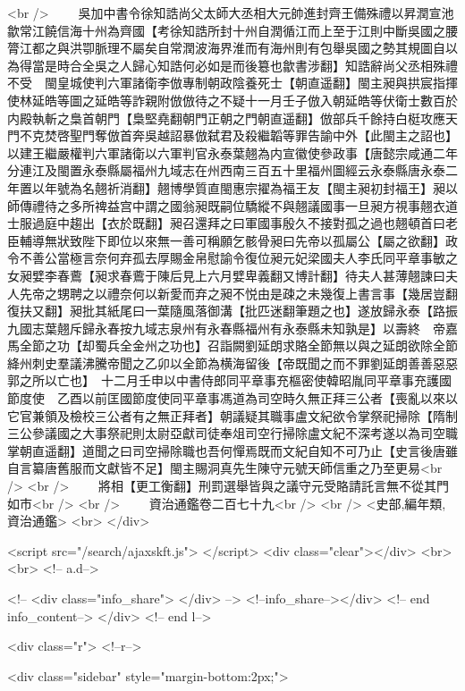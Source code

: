 <br />
　　吳加中書令徐知誥尚父太師大丞相大元帥進封齊王備殊禮以昇潤宣池歙常江饒信海十州為齊國【考徐知誥所封十州自潤循江而上至于江則中斷吳國之腰膂江都之與洪卾脈理不屬矣自常潤波海界淮而有海州則有包舉吳國之勢其規圖自以為得當是時合全吳之人歸心知誥何必如是而後簒也歙書涉翻】知誥辭尚父丞相殊禮不受　閩皇城使判六軍諸衛李倣專制朝政陰養死士【朝直遥翻】閩主昶與拱宸指揮使林延皓等圖之延皓等詐親附倣倣待之不疑十一月壬子倣入朝延皓等伏衛士數百於内殿執斬之梟首朝門【梟堅堯翻朝門正朝之門朝直遥翻】倣部兵千餘持白梃攻應天門不克焚啓聖門奪倣首奔吳越詔暴倣弑君及殺繼韜等罪告諭中外【此閩主之詔也】以建王繼嚴權判六軍諸衛以六軍判官永泰葉翹為内宣徽使參政事【唐懿宗咸通二年分連江及閩置永泰縣屬福州九域志在州西南三百五十里福州圖經云永泰縣唐永泰二年置以年號為名翹祈消翻】翹博學質直閩惠宗擢為福王友【閩主昶初封福王】昶以師傳禮待之多所禆益宫中謂之國翁昶既嗣位驕縱不與翹議國事一旦昶方視事翹衣道士服過庭中趨出【衣於既翻】昶召還拜之曰軍國事殷久不接對孤之過也翹頓首曰老臣輔導無狀致陛下即位以來無一善可稱願乞骸骨昶曰先帝以孤屬公【屬之欲翻】政令不善公當極言奈何弃孤去厚賜金帛慰諭令復位昶元妃梁國夫人李氏同平章事敏之女昶嬖李春鷰【昶求春鷰于陳后見上六月嬖卑義翻又博計翻】待夫人甚薄翹諫曰夫人先帝之甥聘之以禮奈何以新愛而弃之昶不悦由是疎之未幾復上書言事【幾居豈翻復扶又翻】昶批其紙尾曰一葉隨風落御溝【批匹迷翻筆題之也】遂放歸永泰【路振九國志葉翹斥歸永春按九域志泉州有永春縣福州有永泰縣未知孰是】以壽終　帝嘉馬全節之功【却蜀兵全金州之功也】召詣闕劉延朗求賂全節無以與之延朗欲除全節絳州刺史羣議沸騰帝聞之乙卯以全節為横海留後【帝既聞之而不罪劉延朗善善惡惡郭之所以亡也】　十二月壬申以中書侍郎同平章事充樞密使韓昭胤同平章事充護國節度使　乙酉以前匡國節度使同平章事馮道為司空時久無正拜三公者【喪亂以來以它官兼領及檢校三公者有之無正拜者】朝議疑其職事盧文紀欲令掌祭祀掃除【隋制三公參議國之大事祭祀則太尉亞獻司徒奉俎司空行掃除盧文紀不深考遂以為司空職掌朝直遥翻】道聞之曰司空掃除職也吾何憚焉既而文紀自知不可乃止【史言後唐雖自言纂唐舊服而文獻皆不足】閩主賜洞真先生陳守元號天師信重之乃至更易<br />
<br />
　　將相【更工衡翻】刑罰選舉皆與之議守元受賂請託言無不從其門如市<br />
<br />
　　資治通鑑卷二百七十九<br />
<br />
<史部,編年類,資治通鑑>  <br>
   </div> 

<script src="/search/ajaxskft.js"> </script>
 <div class="clear"></div>
<br>
<br>
 <!-- a.d-->

 <!--
<div class="info_share">
</div> 
-->
 <!--info_share--></div>   <!-- end info_content-->
  </div> <!-- end l-->

<div class="r">   <!--r-->



<div class="sidebar"  style="margin-bottom:2px;">

